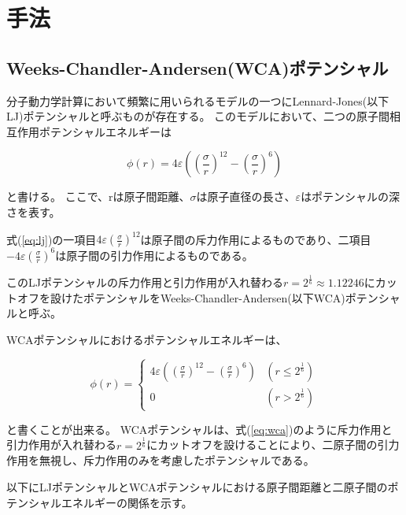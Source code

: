 \documentclass[titlepage]{jsreport}
\begin{document}
\chapter{手法} \label{chap:method}
\section{Weeks-Chandler-Andersen(WCA)ポテンシャル}\label{method-sec:WCA}
分子動力学計算において頻繁に用いられるモデルの一つにLennard-Jones(以下LJ)ポテンシャルと呼ぶものが存在する。
このモデルにおいて、二つの原子間相互作用ポテンシャルエネルギーは

\large
\begin{equation}
\phi(r)=4{\varepsilon}\left(\left(\frac{\sigma}{r}\right)^{12}-\left(\frac{\sigma}{r}\right)^6\right)\label{eq:lj}
\end{equation}

\normalsize
と書ける\cite{WATANABE20191}。
ここで、rは原子間距離、${\sigma}$は原子直径の長さ、${\varepsilon}$はポテンシャルの深さを表す。

式(\ref{eq:lj})の一項目$4{\varepsilon}(\frac{\sigma}{r})^{12}$は原子間の斥力作用によるものであり、二項目$-4\varepsilon(\frac{\sigma}{r})^{6}$は原子間の引力作用によるものである。

このLJポテンシャルの斥力作用と引力作用が入れ替わる$r=2^{\frac{1}{6}}{\approx}1.12246$にカットオフを設けたポテンシャルをWeeks-Chandler-Andersen(以下WCA)ポテンシャルと呼ぶ。

WCAポテンシャルにおけるポテンシャルエネルギーは、

\large
\begin{equation}
\phi(r) = \left\{ \begin{array}{ll}
    4{\varepsilon}\left(\left(\frac{\sigma}{r}\right)^{12}-\left(\frac{\sigma}{r}\right)^6\right) & (r\leq2^{\frac{1}{6}}) \\
    0 & (r>2^{\frac{1}{6}})\label{eq:wca}
\end{array} \right.
\end{equation}

\normalsize
と書くことが出来る\cite{doi:10.1063/1.2176675}。
WCAポテンシャルは、式(\ref{eq:wca})のように斥力作用と引力作用が入れ替わる$r=2^{\frac{1}{6}}$にカットオフを設けることにより、二原子間の引力作用を無視し、斥力作用のみを考慮したポテンシャルである。

以下にLJポテンシャルとWCAポテンシャルにおける原子間距離と二原子間のポテンシャルエネルギーの関係を示す。
\end{document}
